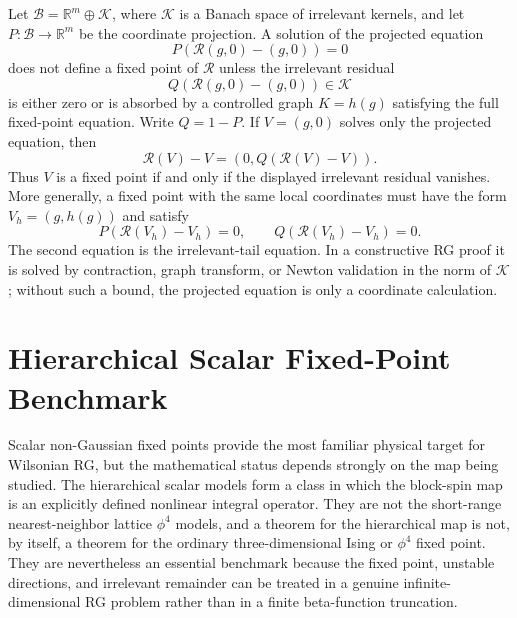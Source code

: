 \begin{remark}
\label{rem:irrelevant-tail-part-of-rg-theorem}
Let \(\mathcal B=\mathbb R^m\oplus\mathcal K\), where \(\mathcal K\) is a
Banach space of irrelevant kernels, and let \(P:\mathcal B\to\mathbb R^m\) be
the coordinate projection.  A solution of the projected equation
\[
  P(\mathcal R(g,0)-(g,0))=0
\]
does not define a fixed point of \(\mathcal R\) unless the irrelevant residual
\[
  Q(\mathcal R(g,0)-(g,0))\in\mathcal K
\]
is either zero or is absorbed by a controlled graph \(K=h(g)\) satisfying the
full fixed-point equation.
Write \(Q=1-P\).  If \(V=(g,0)\) solves only the projected equation, then
\[
  \mathcal R(V)-V=(0,Q(\mathcal R(V)-V)).
\]
Thus \(V\) is a fixed point if and only if the displayed irrelevant residual
vanishes.  More generally, a fixed point with the same local coordinates must
have the form \(V_h=(g,h(g))\) and satisfy
\[
  P(\mathcal R(V_h)-V_h)=0,\qquad
  Q(\mathcal R(V_h)-V_h)=0 .
\]
The second equation is the irrelevant-tail equation.  In a constructive RG
proof it is solved by contraction, graph transform, or Newton validation in
the norm of \(\mathcal K\); without such a bound, the projected equation is
only a coordinate calculation.
\end{remark}

\section{Hierarchical Scalar Fixed-Point Benchmark}

Scalar non-Gaussian fixed points provide the most familiar physical target
for Wilsonian RG, but the mathematical status depends strongly on the map
being studied.  The hierarchical scalar models form a class in which the
block-spin map is an explicitly defined nonlinear integral operator.  They
are not the short-range nearest-neighbor lattice \(\phi^4\) models, and a
theorem for the hierarchical map is not, by itself, a theorem for the
ordinary three-dimensional Ising or \(\phi^4\) fixed point.  They are
nevertheless an essential benchmark because the fixed point, unstable
directions, and irrelevant remainder can be treated in a genuine
infinite-dimensional RG problem rather than in a finite beta-function
truncation.

